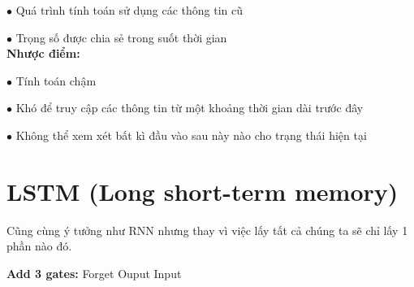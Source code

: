 \documentclass[final,letterpaper,twoside,12pt]{report}
\begin{document}
$\bullet$ Quá trình tính toán sử dụng các thông tin cũ

$\bullet$ Trọng số được chia sẻ trong suốt thời gian \\

\textbf{Nhược điểm:}

$\bullet$  Tính toán chậm

$\bullet$ Khó để truy cập các thông tin từ một khoảng thời gian dài trước đây

$\bullet$ Không thể xem xét bất kì đầu vào sau này nào cho trạng thái hiện tại


\section{LSTM (Long short-term memory)}

Cũng cùng ý tưởng như RNN nhưng thay vì việc lấy tất cả chúng ta sẽ chỉ lấy 1 phần nào đó.

\textbf{Add 3 gates:}
\hspace*{0.25cm} Forget
\hspace*{3cm} Ouput
\hspace*{3cm} Input
\end{document}
